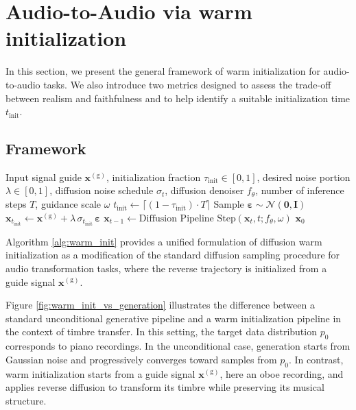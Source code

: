 \documentclass[twoside,a4paper]{article}
\begin{document}
\section{Audio-to-Audio via warm initialization}
\label{Method}
In this section, we present the general framework of warm initialization for audio-to-audio tasks. We also introduce two metrics designed to assess the trade-off between realism and faithfulness and to help identify a suitable initialization time $t_\text{init}$.




\subsection{Framework}
\begin{algorithm}[!t]
\caption{Diffusion Warm Initialization}
\begin{algorithmic}[1]
\Require Input signal guide $\mathbf{x}^{(\mathrm g)}$, initialization fraction $\tau_\text{init}\in [0,1]$, desired noise portion $\lambda  \in [0,1]$, diffusion noise schedule $ \sigma_t$, diffusion denoiser $f_\theta$, number of inference steps $T$, guidance scale $\omega$
\State $t_\text{init} \gets \lceil (1 - \tau_\text{init})\cdot T \rceil$
\State Sample $\boldsymbol \varepsilon \sim \mathcal{N}(\mathbf 0, \mathbf I)$
\State $\mathbf{x}_{t_\text{init}} \gets  \mathbf{x}^{(\mathrm g)} + \lambda \,\sigma_{t_\text{init}}\, \boldsymbol \varepsilon$
    \State $\mathbf{x}_{t-1} \gets \text{Diffusion Pipeline Step}(\mathbf{x}_t, t; f_\theta, \omega)$
\EndFor
\State \Return $\mathbf{x}_0$
\end{algorithmic}
\label{alg:warm_init}
\end{algorithm}

Algorithm \ref{alg:warm_init} provides a unified formulation of diffusion warm initialization as a modification of the standard diffusion sampling procedure for audio transformation tasks, where the reverse trajectory is initialized from a guide signal $\mathbf{x}^{(\mathrm g)} $.

Figure \ref{fig:warm_init_vs_generation} illustrates the difference between a standard unconditional generative pipeline and a warm initialization pipeline in the context of timbre transfer. In this setting, the target data distribution $p_0$ corresponds to piano recordings. In the unconditional case, generation starts from Gaussian noise and progressively converges toward samples from $p_0$. In contrast, warm initialization starts from a guide signal $\mathbf{x}^{(\mathrm g)}$, here an oboe recording, and applies reverse diffusion to transform its timbre while preserving its musical structure.
\end{document}
